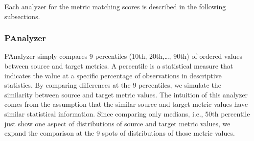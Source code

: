 




Each analyzer for the metric matching scores is described in the following subsections.

\subsubsection{PAnalyzer}
PAnalyzer simply compares 9 percentiles (10th, 20th,\ldots, 90th) of ordered
values between source and target metrics. A percentile is a statistical measure that indicates the value at a specific percentage of observations in descriptive statistics. By comparing differences at the 9 percentiles, we simulate the similarity between source and target metric values. The intuition of this analyzer comes from the assumption that the similar source and target metric values have similar statistical information. Since comparing only medians, i.e., 50th percentile just show one aspect of distributions of source and target metric values, we expand the comparison at the 9 spots of distributions of those metric values.

